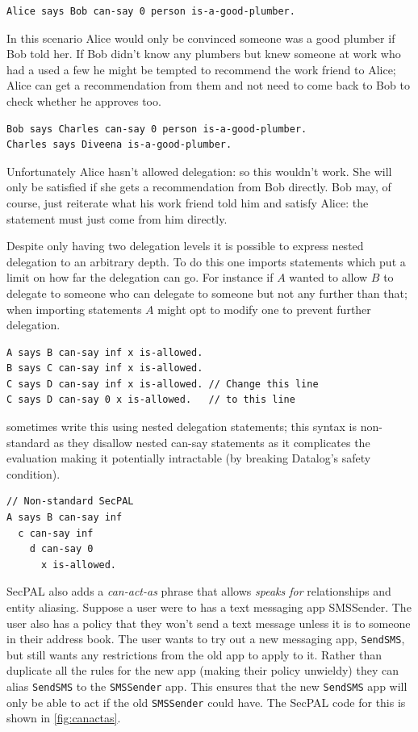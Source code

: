 \documentclass[a4paper,sfsidenotes]{%
  article%
}
\begin{document}
\begin{lstlisting}[language=SecPAL]
Alice says Bob can-say 0 person is-a-good-plumber.
\end{lstlisting}

In this scenario Alice would only be convinced someone was a good plumber if Bob
told her.  If Bob didn't know any plumbers but knew someone at work who had a
used a few he might be tempted to recommend the work friend to Alice; Alice can
get a recommendation from them and not need to come back to Bob to check whether
he approves too.

\begin{lstlisting}[language=SecPAL]
Bob says Charles can-say 0 person is-a-good-plumber.
Charles says Diveena is-a-good-plumber.
\end{lstlisting}

Unfortunately Alice hasn't allowed delegation: so this wouldn't work.  She will
only be satisfied if she gets a recommendation from Bob directly.  Bob may, of
course, just reiterate what his work friend told him and satisfy Alice: the
statement must just come from him directly.

Despite only having two delegation levels it is possible to express nested
delegation to an arbitrary depth.  To do this one imports statements which put a
limit on how far the delegation can go.  For instance if $A$ wanted to allow $B$
to delegate to someone who can delegate to someone but not any further than
that; when importing statements $A$ might opt to modify one to prevent further
delegation.

\begin{lstlisting}[language=SecPAL]
A says B can-say inf x is-allowed.
B says C can-say inf x is-allowed. 
C says D can-say inf x is-allowed. // Change this line
C says D can-say 0 x is-allowed.   // to this line
\end{lstlisting}

\citeauthor{Becker:2006vh} sometimes write this using nested delegation
statements; this syntax is non-standard as they disallow nested can-say
statements as it complicates the evaluation making it potentially intractable
(by breaking Datalog's safety condition).

\begin{lstlisting}[language=SecPAL]
// Non-standard SecPAL
A says B can-say inf 
  c can-say inf
    d can-say 0 
      x is-allowed.
\end{lstlisting}

{SecPAL} also adds a \emph{can-act-as} phrase that allows \emph{speaks for}
relationships and entity aliasing.  Suppose a user were to has a text messaging
app SMSSender.  The user also has a policy that they won't send a text message
unless it is to someone in their address book.  The user wants to try out a new
messaging app, \texttt{SendSMS}, but still wants any restrictions from the old
app to apply to it.  Rather than duplicate all the rules for the new app (making
their policy unwieldy) they can alias \texttt{SendSMS} to the \texttt{SMSSender}
app.  This ensures that the new \texttt{SendSMS} app will only be able to act if
the old \texttt{SMSSender} could have. The SecPAL code for this is shown in
\autoref{fig:canactas}.
\end{document}
